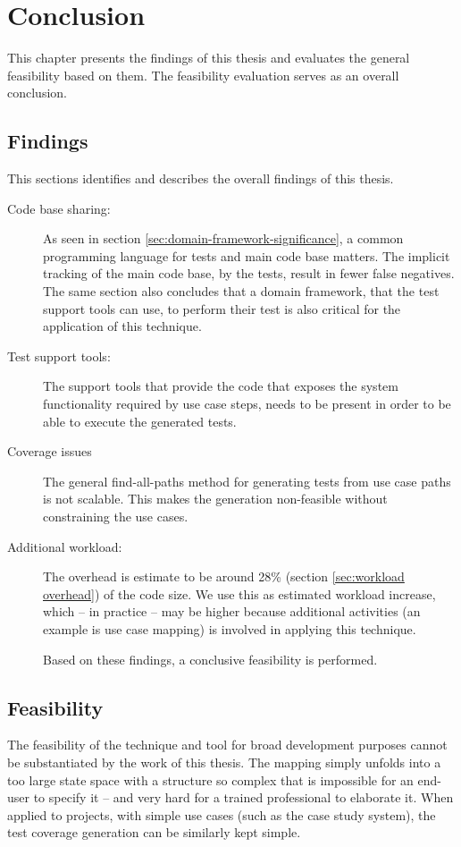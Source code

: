 \chapter{Conclusion}
This chapter presents the findings of this thesis and evaluates the general feasibility based on them. The feasibility evaluation serves as an overall conclusion.

\section{Findings}
This sections identifies and describes the overall findings of this thesis.

\begin{description}

  \item[Code base sharing:] As seen in section \ref{sec:domain-framework-significance}, a common programming language for tests and main code base matters. The implicit tracking of the main code base, by the tests, result in fewer false negatives. The same section also concludes that a domain framework, that the test support tools can use, to perform their test is also critical for the application of this technique.

  \item[Test support tools:] The support tools that provide the code that exposes the system functionality required by use case steps, needs to be present in order to be able to execute the generated tests.

  \item[Coverage issues] The general find-all-paths method for generating tests from use case paths is not scalable. This makes the generation non-feasible without constraining the use cases.

  \item[Additional workload:] The overhead is estimate to be around 28\% (section \ref{sec:workload overhead}) of the code size. We use this as estimated workload increase, which -- in practice -- may be higher because additional activities (an example is use case mapping) is involved in applying this technique.

Based on these findings, a conclusive feasibility is performed.
\end{description}

\section{Feasibility}
The feasibility of the technique and tool for broad development purposes cannot be substantiated by the work of this thesis. The mapping simply unfolds into a too large state space with a structure so complex that is impossible for an end-user to specify it -- and very hard for a trained professional to elaborate it. When applied to projects, with simple use cases (such as the case study system), the test coverage generation can be similarly kept simple.\medskip

